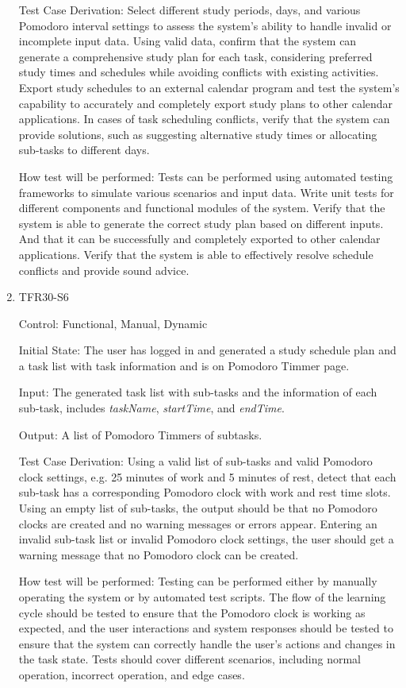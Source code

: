 \documentclass[12pt, titlepage]{article}
\begin{document}
\begin{enumerate}
Test Case Derivation: Select different study periods, days, and various Pomodoro interval settings to assess the system's ability to handle invalid or incomplete input data. Using valid data, confirm that the system can generate a comprehensive study plan for each task, considering preferred study times and schedules while avoiding conflicts with existing activities. Export study schedules to an external calendar program and test the system's capability to accurately and completely export study plans to other calendar applications. In cases of task scheduling conflicts, verify that the system can provide solutions, such as suggesting alternative study times or allocating sub-tasks to different days.

How test will be performed: Tests can be performed using automated testing frameworks to simulate various scenarios and input data. Write unit tests for different components and functional modules of the system. Verify that the system is able to generate the correct study plan based on different inputs. And that it can be successfully and completely exported to other calendar applications. Verify that the system is able to effectively resolve schedule conflicts and provide sound advice.

\item{TFR30-S6\\} \label{TFR30-S6}

Control: Functional, Manual, Dynamic

Initial State: The user has logged in and generated a study schedule plan and a task list with task information and is on Pomodoro Timmer page.
					
Input: The generated task list with sub-tasks and the information of each sub-task, includes \textit{taskName}, \textit{startTime}, and \textit{endTime}.
					
Output: A list of Pomodoro Timmers of subtasks.

Test Case Derivation: Using a valid list of sub-tasks and valid Pomodoro clock settings, e.g. 25 minutes of work and 5 minutes of rest, detect that each sub-task has a corresponding Pomodoro clock with work and rest time slots. Using an empty list of sub-tasks, the output should be that no Pomodoro clocks are created and no warning messages or errors appear. Entering an invalid sub-task list or invalid Pomodoro clock settings, the user should get a warning message that no Pomodoro clock can be created.
					
How test will be performed: Testing can be performed either by manually operating the system or by automated test scripts. The flow of the learning cycle should be tested to ensure that the Pomodoro clock is working as expected, and the user interactions and system responses should be tested to ensure that the system can correctly handle the user's actions and changes in the task state. Tests should cover different scenarios, including normal operation, incorrect operation, and edge cases.


\end{enumerate}
\end{document}
